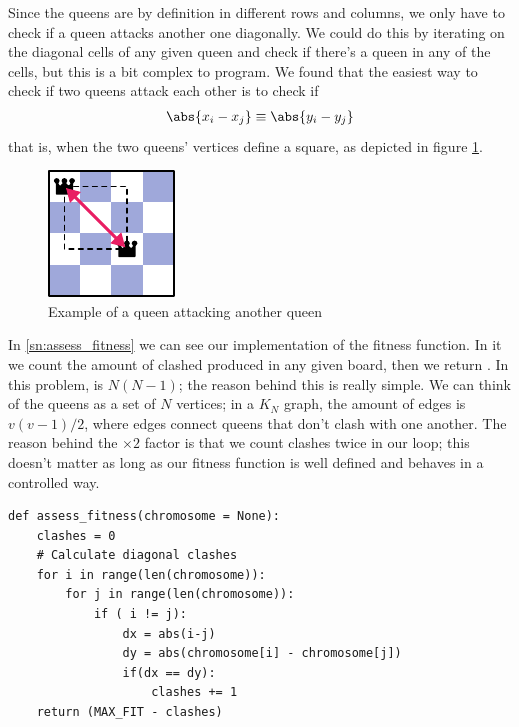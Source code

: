 Since the queens are by definition in different rows and columns, we only have to check if a queen attacks another one diagonally. We could do this by iterating on the diagonal cells of any given queen and check if there's a queen in any of the cells, but this is a bit complex to program. We found that the easiest way to check if two queens attack each other is to check if
\begin{align}
	\abs{ x_{i} - x_{j} } \equiv \abs{ y_{i} - y_{j} }
\end{align}
that is, when the two queens' vertices define a square, as depicted in figure \ref{fig:4queens-attack}.

\begin{figure}[H]
	\centering
	\includegraphics[height=0.18\textwidth]{images/4queens-attack}
	\caption{Example of a queen attacking another queen}
	\label{fig:4queens-attack}
\end{figure}

In \cref{sn:assess_fitness} we can see our implementation of the fitness function. In it we count the amount of clashed produced in any given board, then we return . In this problem,  is $N (N-1)$; the reason behind this is really simple. We can think of the queens as a set of $N$ vertices; in a $K_{N}$ graph, the amount of edges is $v (v-1)/ 2$, where edges connect queens that don't clash with one another. The reason behind the $\times 2$ factor is that we count clashes twice in our loop; this doesn't matter as long as our fitness function is well defined and behaves in a controlled way.

\begin{lstlisting}[label=sn:assess_fitness, caption=Fitness function]
def assess_fitness(chromosome = None):
	clashes = 0
	# Calculate diagonal clashes
	for i in range(len(chromosome)):
		for j in range(len(chromosome)):
			if ( i != j):
				dx = abs(i-j)
				dy = abs(chromosome[i] - chromosome[j])
				if(dx == dy):
					clashes += 1
	return (MAX_FIT - clashes)
\end{lstlisting}


